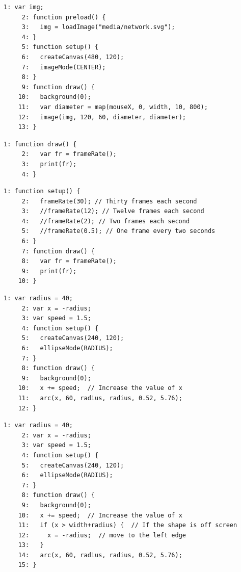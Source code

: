 \documentclass[a4j]{ltjsarticle}
\begin{document}
\vspace{1in}
\begin{lstlisting}[caption=Ex\_07\_10.js]
     1: var img;
     2: function preload() {
     3:   img = loadImage("media/network.svg");
     4: }
     5: function setup() {
     6:   createCanvas(480, 120);
     7:   imageMode(CENTER);
     8: }
     9: function draw() {
    10:   background(0);
    11:   var diameter = map(mouseX, 0, width, 10, 800);
    12:   image(img, 120, 60, diameter, diameter);
    13: }
\end{lstlisting}
\vspace{1in}
\begin{lstlisting}[caption=Ex\_08\_01.js]
     1: function draw() {
     2:   var fr = frameRate();  
     3:   print(fr);
     4: }
\end{lstlisting}
\vspace{1in}
\begin{lstlisting}[caption=Ex\_08\_02.js]
     1: function setup() {
     2:   frameRate(30); // Thirty frames each second
     3:   //frameRate(12); // Twelve frames each second
     4:   //frameRate(2); // Two frames each second
     5:   //frameRate(0.5); // One frame every two seconds
     6: }
     7: function draw() {
     8:   var fr = frameRate();  
     9:   print(fr);
    10: }
\end{lstlisting}
\vspace{1in}
\begin{lstlisting}[caption=Ex\_08\_03.js]
     1: var radius = 40;
     2: var x = -radius;
     3: var speed = 1.5;
     4: function setup() {
     5:   createCanvas(240, 120);
     6:   ellipseMode(RADIUS);
     7: }
     8: function draw() {
     9:   background(0);
    10:   x += speed;  // Increase the value of x
    11:   arc(x, 60, radius, radius, 0.52, 5.76);
    12: }
\end{lstlisting}
\vspace{1in}
\begin{lstlisting}[caption=Ex\_08\_04.js]
     1: var radius = 40;
     2: var x = -radius;
     3: var speed = 1.5;
     4: function setup() {
     5:   createCanvas(240, 120);
     6:   ellipseMode(RADIUS);
     7: }
     8: function draw() {
     9:   background(0);
    10:   x += speed;  // Increase the value of x
    11:   if (x > width+radius) {  // If the shape is off screen
    12:     x = -radius;  // move to the left edge
    13:   }
    14:   arc(x, 60, radius, radius, 0.52, 5.76);
    15: }
\end{lstlisting}
\vspace{1in}
\end{document}
